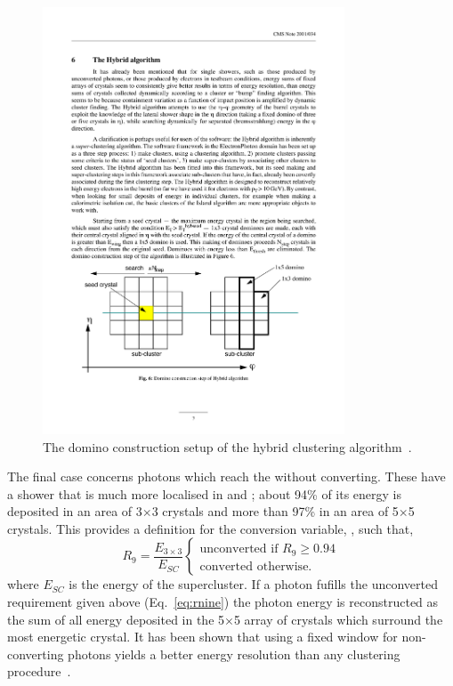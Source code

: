 \begin{figure}
  \includegraphics[width=0.8\textwidth]{cms_experiment/plots/hybrid_clustering.pdf}
  \caption[A schematic of the domino clustering algorithm]{The domino construction setup of the hybrid clustering algorithm~\cite{ecal_electron_reco}.}
  \label{fig:hybrid_algo}
\end{figure}

The final case concerns photons which reach the \ECAL without converting. These have a shower that is much more localised in \eta and \phi; about 94\% of its energy is deposited in an area of 3$\times$3 crystals and more than 97\% in an area of 5$\times$5 crystals. This provides a definition for the conversion variable, \rnine, such that, 
\begin{equation}
	R_{9} = \frac{E_{3\times3}}{E_{SC}} 
	\begin{cases}
		\text{unconverted if } R_9\geq0.94 \\
		\text{converted otherwise}.
	\end{cases}
  \label{eq:rnine}
\end{equation}
where $E_{SC}$ is the energy of the supercluster. If a photon fufills the unconverted requirement given above (Eq.~\ref{eq:rnine}) the photon energy is reconstructed as the sum of all energy deposited in the 5$\times$5 array of crystals which surround the most energetic crystal. It has been shown that using a fixed window for non-converting photons yields a better energy resolution than any clustering procedure~\cite{ecal_electron_reco}.

